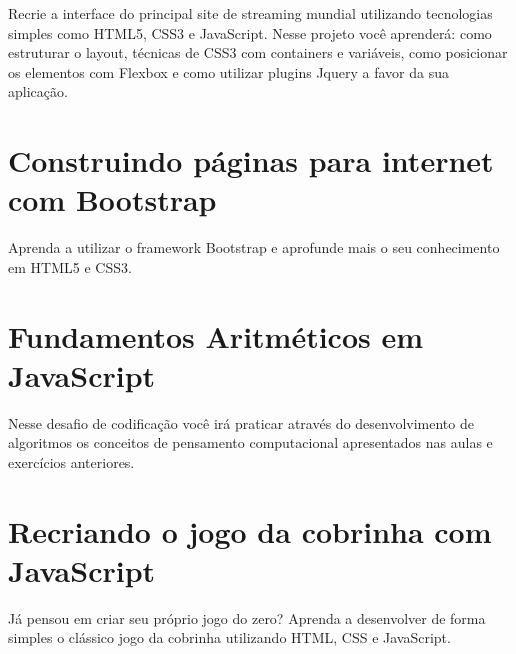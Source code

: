 \documentclass[12pt,a4paper]{article}
\begin{document}
	Recrie a interface do principal site de streaming mundial utilizando tecnologias simples como HTML5, CSS3 e JavaScript. Nesse projeto você aprenderá: como estruturar o layout, técnicas de CSS3 com containers e variáveis, como posicionar os elementos com Flexbox e como utilizar plugins Jquery a favor da sua aplicação.
	
	\section{Construindo páginas para internet com Bootstrap}
	
	Aprenda a utilizar o framework Bootstrap e aprofunde mais o seu conhecimento em HTML5 e CSS3.
	
	\section{Fundamentos Aritméticos em JavaScript}
	
	Nesse desafio de codificação você irá praticar através do desenvolvimento de algoritmos os conceitos de pensamento computacional apresentados nas aulas e exercícios anteriores.
	
	\section{Recriando o jogo da cobrinha com JavaScript}
	
	Já pensou em criar seu próprio jogo do zero? Aprenda a desenvolver de forma simples o clássico jogo da cobrinha utilizando HTML, CSS e JavaScript.
	
\end{document}
